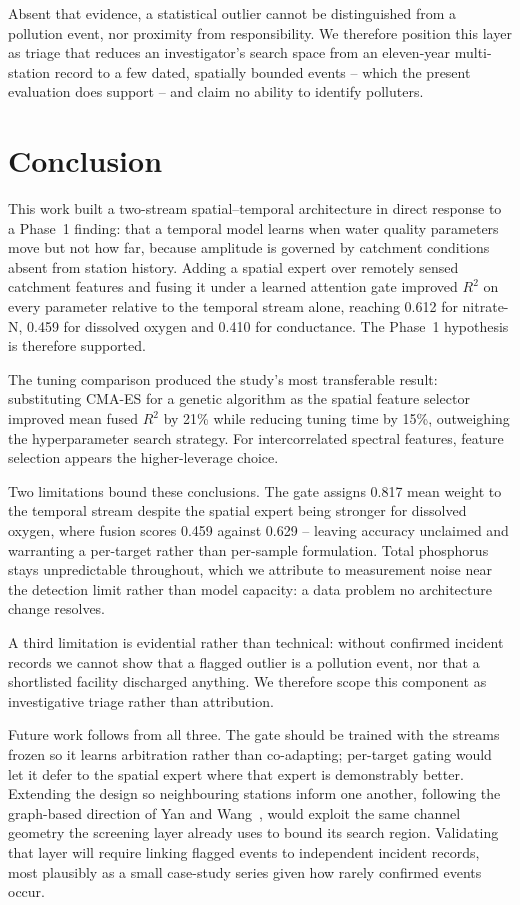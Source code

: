 \documentclass[conference]{IEEEtran}
\begin{document}
Absent that evidence, a statistical outlier cannot be distinguished from a
pollution event, nor proximity from responsibility. We therefore position this
layer as triage that reduces an investigator's search space from an eleven-year
multi-station record to a few dated, spatially bounded events -- which the
present evaluation does support -- and claim no ability to identify
polluters.

\section{Conclusion}

This work built a two-stream spatial--temporal architecture in direct response
to a Phase~1 finding: that a temporal model learns when water quality
parameters move but not how far, because amplitude is governed by catchment
conditions absent from station history. Adding a spatial expert over
remotely sensed catchment features and fusing it under a learned attention gate
improved $R^2$ on every parameter relative to the temporal stream alone,
reaching 0.612 for nitrate-N, 0.459 for dissolved oxygen and 0.410 for
conductance. The Phase~1 hypothesis is therefore supported.

The tuning comparison produced the study's most transferable result:
substituting CMA-ES for a genetic algorithm as the spatial feature selector
improved mean fused $R^2$ by 21\% while reducing tuning time by 15\%,
outweighing the hyperparameter search strategy. For intercorrelated spectral
features, feature selection appears the higher-leverage choice.

Two limitations bound these conclusions. The gate assigns 0.817 mean weight to
the temporal stream despite the spatial expert being stronger for dissolved
oxygen, where fusion scores 0.459 against 0.629 -- leaving accuracy unclaimed
and warranting a per-target rather than per-sample formulation. Total
phosphorus stays unpredictable throughout, which we attribute to measurement
noise near the detection limit rather than model capacity: a data problem no
architecture change resolves.

A third limitation is evidential rather than technical: without confirmed
incident records we cannot show that a flagged outlier is a pollution event,
nor that a shortlisted facility discharged anything. We therefore scope this
component as investigative triage rather than attribution.

Future work follows from all three. The gate should be trained with the streams
frozen so it learns arbitration rather than co-adapting; per-target gating
would let it defer to the spatial expert where that expert is demonstrably
better. Extending the design so neighbouring stations inform one another,
following the graph-based direction of Yan and Wang~\cite{yan}, would exploit
the same channel geometry the screening layer already uses to bound its search
region. Validating that layer will require linking flagged events to
independent incident records, most plausibly as a small case-study series
given how rarely confirmed events occur.
\end{document}
